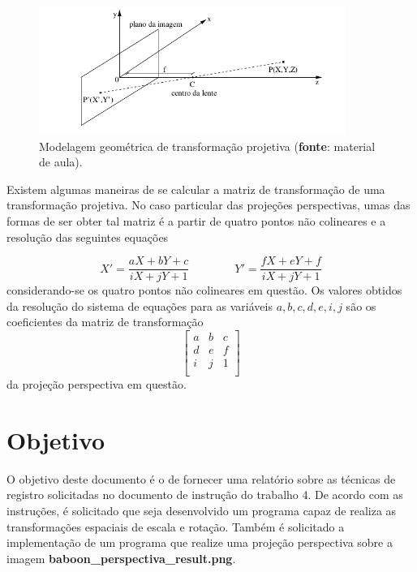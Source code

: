 \documentclass{article}
\begin{document}
\begin{figure}[!htp]%
	\centering
	\includegraphics[width=10cm]{transformacaoprojetiva.png}
	\caption{Modelagem geométrica de transformação projetiva (\textbf{fonte}: material de aula).}%
	\label{fig:transpro}%
\end{figure}

\newpage
Existem algumas maneiras de se calcular a matriz de transformação de uma transformação projetiva. No caso particular das projeções perspectivas, umas das formas de ser obter tal matriz é a partir de quatro pontos não colineares e a resolução das seguintes equações

\begin{equation}
X' = \frac{aX + bY + c}{iX + jY + 1}
\qquad\qquad
Y' = \frac{fX + eY + f}{iX + jY + 1}
\label{eq:transpes}
\end{equation}
considerando-se os quatro pontos não colineares em questão. Os valores obtidos da resolução do sistema de equações para as variáveis $a,b,c,d,e,i,j$ são os coeficientes da matriz de transformação 
\[
\begin{bmatrix} 
	a & b & c \\
	d & e & f \\
	i & j & 1 \\
\end{bmatrix}
\]
da projeção perspectiva em questão.

%
\section{Objetivo}
O objetivo deste documento é o de fornecer uma relatório sobre as técnicas de registro solicitadas no documento de instrução do trabalho 4. De acordo com as instruções, é solicitado que seja desenvolvido um programa capaz de realiza as transformações espaciais de escala e rotação. Também é solicitado a implementação de um programa que realize uma projeção perspectiva sobre a imagem \textbf{baboon\_perspectiva\_result.png}.


%
\end{document}
